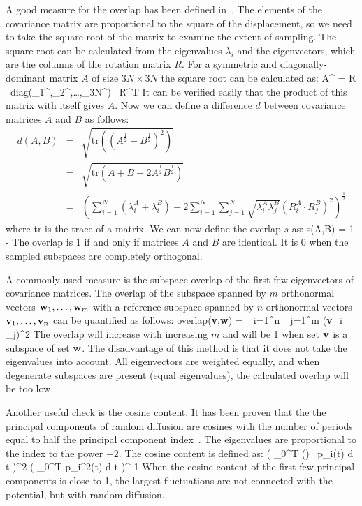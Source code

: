 A good measure for the overlap has been defined in~\cite{Hess2002b}.
The elements of the covariance matrix are proportional to the square
of the displacement, so we need to take the square root of the matrix
to examine the extent of sampling. The square root can be
calculated from the eigenvalues $\lambda_i$ and the eigenvectors,
which are the columns of the rotation matrix $R$.
For a symmetric and diagonally-dominant matrix $A$ of size $3N \times 3N$
the square root can be calculated as:
\beq
A^ = 
R \, \mbox{diag}(\lambda_1^,\lambda_2^,\ldots,\lambda_{3N}^) \, R^T
\eeq
It can be verified easily that the product of this matrix with itself gives
$A$.
Now we can define a difference $d$ between covariance matrices $A$ and $B$
as follows:
\begin{eqnarray}
d(A,B) & = & \sqrt{\mbox{tr}\left(\left(A^\frac{1}{2} - B^\frac{1}{2}\right)^2\right)
}
\\ & = &
\sqrt{\mbox{tr}\left(A + B - 2 A^\frac{1}{2} B^\frac{1}{2}\right)}
\\ & = &
\left( \sum_{i=1}^N \left( \lambda_i^A + \lambda_i^B \right)
- 2 \sum_{i=1}^N \sum_{j=1}^N \sqrt{\lambda_i^A \lambda_j^B}
\left(R_i^A \cdot R_j^B\right)^2 \right)^\frac{1}{2}
\end{eqnarray}
where tr is the trace of a matrix.
We can now define the overlap $s$ as:
\beq
s(A,B) = 1 - 
\eeq
The overlap is 1 if and only if matrices $A$ and $B$ are identical.
It is 0 when the sampled subspaces are completely orthogonal.

A commonly-used measure is the subspace overlap of the first few
eigenvectors of covariance matrices.
The overlap of the subspace spanned by $m$ orthonormal vectors 
${\bf w}_1,\ldots,{\bf w}_m$ with a reference subspace spanned by 
$n$ orthonormal vectors ${\bf v}_1,\ldots,{\bf v}_n$
can be quantified as follows:
\beq
\mbox{overlap}({\bf v},{\bf w}) =
 \sum_{i=1}^n \sum_{j=1}^m ({\bf v}_i _j)^2
\eeq
The overlap will increase with increasing $m$ and will be 1 when
set ${\bf v}$ is a subspace of set ${\bf w}$.
The disadvantage of this method is that it does not take the eigenvalues
into account. All eigenvectors are weighted equally, and when
degenerate subspaces are present (equal eigenvalues), the calculated overlap
will be too low.

Another useful check is the cosine content. It has been proven that the
the principal components of random diffusion are cosines with the number of
periods equal to half the principal component index~\cite{Hess2000,Hess2002b}.
The eigenvalues are proportional to the index to the power $-2$.
The cosine content is defined as:
\beq
{}
\left( \int_0^T \cos\left(\right) \, p_i(t) \mbox{d} t \right)^2
\left( \int_0^T p_i^2(t) \mbox{d} t \right)^{-1}
\eeq
When the cosine content of the first few principal components
is close to 1, the largest fluctuations are not connected with
the potential, but with random diffusion.


